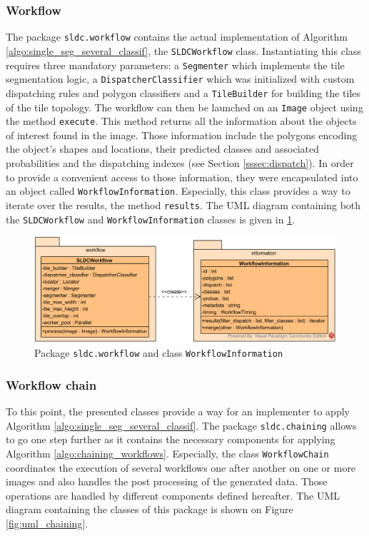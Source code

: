 \subsubsection{Workflow}

The package \texttt{sldc.workflow} contains the actual implementation of Algorithm \ref{algo:single_seg_several_classif}, the \texttt{SLDCWorkflow} class. Instantiating this class requires three mandatory parameters: a \texttt{Segmenter} which implements the tile segmentation logic, a \texttt{DispatcherClassifier} which was initialized with custom dispatching rules and polygon classifiers and a \texttt{TileBuilder} for building the tiles of the tile topology. The workflow can then be launched on an \texttt{Image} object using the method \texttt{execute}. This method returns all the information about the objects of interest found in the image. Those information include the polygons encoding the object's shapes and locations, their predicted classes and associated probabilities and the dispatching indexes (see Section \ref{sssec:dispatch}). In order to provide a convenient access to those information, they were encapsulated into an object called \texttt{WorkflowInformation}. Especially, this class provides a way to iterate over the results, the method \texttt{results}. The UML diagram containing both the \texttt{SLDCWorkflow} and \texttt{WorkflowInformation} classes is given in \ref{fig:uml_workflow}.

\begin{figure}
	\center
	\includegraphics[scale=0.75]{image/uml_workflow.png}
	\caption{Package \texttt{sldc.workflow} and class \texttt{WorkflowInformation}}
	\label{fig:uml_workflow}
\end{figure}

\subsubsection{Workflow chain}
To this point, the presented classes provide a way for an implementer to apply Algorithm \ref{algo:single_seg_several_classif}. The package \texttt{sldc.chaining} allows to go one step further as it contains the necessary components for applying Algorithm \ref{algo:chaining_workflows}. Especially, the class \texttt{WorkflowChain} coordinates the execution of several workflows one after another on one or more images and also handles the post processing of the generated data. Those operations are handled by different components defined hereafter. The UML diagram containing the classes of this package is shown on Figure \ref{fig:uml_chaining}.

